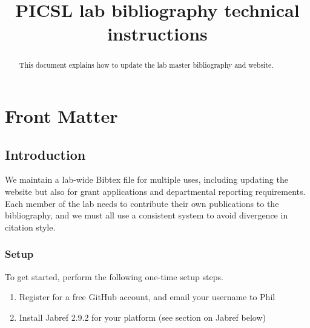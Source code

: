 \documentclass{InsightArticle}
\title{PICSL lab bibliography technical instructions}
\begin{document}
%
% 


\ifpdf
\else
\fi


\maketitle


\ifhtml
\chapter*{Front Matter\label{front}}
\fi



\begin{abstract}
\noindent This document explains how to update the lab master bibliography and website.
\end{abstract}

\tableofcontents
\newpage

\section{Introduction}

We maintain a lab-wide Bibtex file for multiple uses, including updating the website but also for grant applications and departmental reporting requirements. Each member of the lab needs to contribute their own publications to the bibliography, and we must all use a consistent system to avoid divergence in citation style.

\subsection{Setup}

To get started, perform the following one-time setup steps.

\begin{enumerate}
\item Register for a free GitHub account, and email your username to Phil
\item Install Jabref 2.9.2 for your platform (see section on Jabref below)
\end{enumerate}
\end{document}
